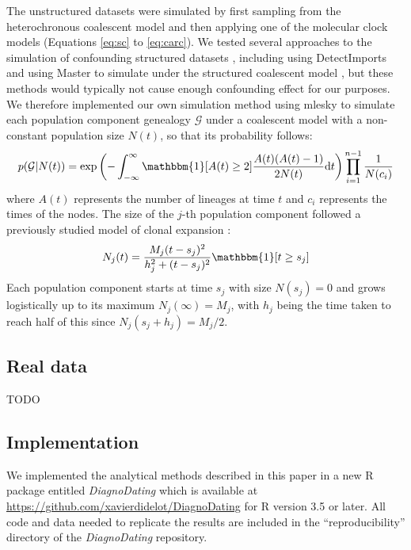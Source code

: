 \documentclass{article}
\begin{document}
The unstructured datasets were simulated by first sampling from the 
heterochronous coalescent model \citep{Drummond2002} and then applying one of the molecular
clock models (Equations \ref{eq:sc} to \ref{eq:carc}). 
We tested several approaches to the simulation of confounding structured datasets \citep{Murray2016}, 
including using 
DetectImports \citep{Didelot2022detectimports} and using Master \citep{Vaughan2013} to 
simulate under the structured coalescent model \citep{Nordborg1997}, but these methods would
typically not cause enough confounding effect for our purposes. We therefore implemented our own
simulation method using mlesky \citep{Didelot2023mlesky} to simulate each population component genealogy $\mathcal{G}$
under a coalescent model with a non-constant population size $N(t)$, so that its probability follows:
\begin{equation}
p(\mathcal{G}|N(t))=\exp \left(-\int_{-\infty}^{\infty}\mathbbm{1}[A(t)\geq 2]
\frac{A(t)(A(t)-1)}{2N(t)} \mathrm{d}t\right) \prod_{i=1}^{n-1} \frac{1}{N(c_{i})}
\label{eqn:coalescent}
\end{equation}
\noindent where $A(t)$ represents the number of lineages
at time $t$ and $c_i$ represents the times of the nodes.
The size of the $j$-th population component followed 
a previously studied model of clonal expansion \citep{Helekal2021}:
\begin{equation}
N_j(t)=\frac{M_j(t-s_j)^2}{h_j^2+(t-s_j)^2}\mathbbm{1}[t \geq s_j]
\end{equation}
Each population component starts at time $s_j$ with 
size $N(s_j)=0$ and grows logistically up to its maximum $N_j(\infty)=M_j$, with $h_j$ being the time 
taken to reach half of this since $N_j(s_j+h_j)=M_j/2$. 

\subsection*{Real data}

TODO

\subsection*{Implementation}

We implemented the analytical methods described in this paper in a 
new R package entitled \emph{DiagnoDating} which is available
at \url{https://github.com/xavierdidelot/DiagnoDating} for R version 3.5 or later. 
All code and data needed to replicate the results are included in the ``reproducibility'' directory of the \emph{DiagnoDating} repository.
\end{document}
